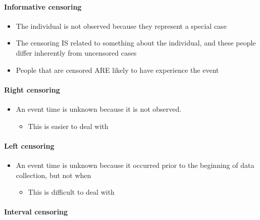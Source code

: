 \documentclass[
]{article}
\providecommand{\tightlist}{%
  \setlength{\itemsep}{0pt}\setlength{\parskip}{0pt}}
\begin{document}
\hypertarget{informative-censoring}{%
\paragraph{Informative censoring}\label{informative-censoring}}

\begin{itemize}
\tightlist
\item
  The individual is not observed because they represent a special case
\item
  The censoring IS related to something about the individual, and these people differ inherently from uncensored cases
\item
  People that are censored ARE likely to have experience the event
\end{itemize}

\hypertarget{right-censoring}{%
\paragraph{Right censoring}\label{right-censoring}}

\begin{itemize}
\tightlist
\item
  An event time is unknown because it is not observed.

  \begin{itemize}
  \tightlist
  \item
    This is easier to deal with
  \end{itemize}
\end{itemize}

\hypertarget{left-censoring}{%
\paragraph{Left censoring}\label{left-censoring}}

\begin{itemize}
\tightlist
\item
  An event time is unknown because it occurred prior to the beginning of data collection, but not when

  \begin{itemize}
  \tightlist
  \item
    This is difficult to deal with
  \end{itemize}
\end{itemize}

\hypertarget{interval-censoring}{%
\paragraph{Interval censoring}\label{interval-censoring}}
\end{document}
